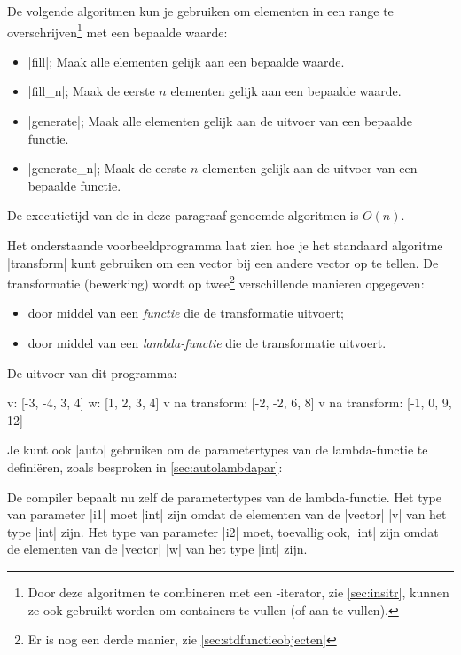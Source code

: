 \begin{cpplstShortInline}
De volgende algoritmen kun je gebruiken om elementen in een range te overschrijven\footnote{%
	Door deze algoritmen te combineren met een \hyp{}iterator, zie \cref{sec:insitr}, kunnen ze ook gebruikt worden om containers te vullen (of aan te vullen).
} met een bepaalde waarde:
\begin{itemize}
	\item |fill|; Maak alle elementen gelijk aan een bepaalde waarde.
	\item |fill_n|; Maak de eerste $n$ elementen gelijk aan een bepaalde waarde.
	\item |generate|; Maak alle elementen gelijk aan de uitvoer van een bepaalde functie.
	\item |generate_n|; Maak de eerste $n$ elementen gelijk aan de uitvoer van een bepaalde functie.
\end{itemize}

De executietijd van de in deze paragraaf genoemde algoritmen is $O(n)$.

\label{sec:transform}
Het onderstaande voorbeeldprogramma  laat zien hoe je het standaard algoritme |transform| kunt gebruiken om een vector bij een andere vector op te tellen.
De transformatie (bewerking) wordt op twee\footnote{%
	Er is nog een derde manier, zie \cref{sec:stdfunctieobjecten}
} verschillende manieren opgegeven:
\begin{itemize}
	\item door middel van een \emph{functie} die de transformatie uitvoert;
	\item door middel van een \emph{lambda\hyp{}functie} die de transformatie uitvoert.
\end{itemize}


De uitvoer van dit programma:
\begin{coutput}
v: [-3, -4, 3, 4]
w: [1, 2, 3, 4]
v na transform: [-2, -2, 6, 8]
v na transform: [-1, 0, 9, 12]
\end{coutput}

Je kunt ook |auto| gebruiken om de parametertypes van de lambda\hyp{}functie te definiëren, zoals besproken in \cref{sec:autolambdapar}:


De compiler bepaalt nu zelf de parametertypes van de lambda\hyp{}functie.
Het type van parameter |i1| moet |int| zijn omdat de elementen van de |vector| |v| van het type |int| zijn.
Het type van parameter |i2| moet, toevallig ook, |int| zijn omdat de elementen van de |vector| |w| van het type |int| zijn.


\end{cpplstShortInline}
